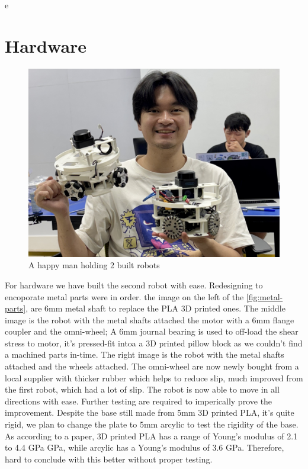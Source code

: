 e\chapter{Hardware}



\begin{figure} [H]
    \centering
    \includegraphics[width=0.65\linewidth]{assets/images/hardware/IMG_8290.jpeg}
    \caption{A happy man holding 2 built robots}
    \label{fig:have2robots}
\end{figure}
For hardware we have built the second robot with ease. Redesigning to encoporate metal parts were in order. the image on the left of the \ref{fig:metal-parts}, are 6mm metal shaft to replace the PLA 3D printed ones. The middle image is the robot with the metal shafts attached the motor with a 6mm flange coupler and the omni-wheel; A 6mm journal bearing is used to off-load the shear stress to motor, it's pressed-fit intoa a 3D printed pillow block as we couldn't find a machined parts in-time. The right image is the robot with the metal shafts attached and the wheels attached. 
The omni-wheel are now newly bought from a local supplier with thicker rubber which helps to reduce slip, much improved from the first robot, which had a lot of slip. The robot is now able to move in all directions with ease. Further testing are required to imperically prove the improvement. Despite the base still made from 5mm 3D printed PLA, it's quite rigid, we plan to change the plate to 5mm arcylic to test the rigidity of the base. As according to a paper, 3D printed PLA has a range of Young's modulus of 2.1 to 4.4 GPa GPa, while arcylic has a Young's modulus of 3.6 GPa. Therefore, hard to conclude with this better without proper testing. 

